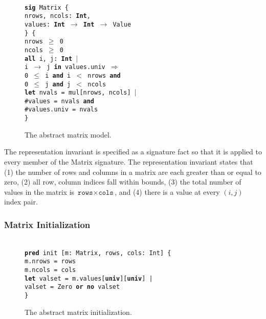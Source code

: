 \documentclass[11pt,conference]{IEEEtran}
\newenvironment{myquote}{\list{}{\leftmargin=12pt\rightmargin=0pt}\item[]}{\endlist}
\def\TA{\makebox[12pt]{}}
\def\TB{\makebox[24pt]{}}
\def\TC{\makebox[36pt]{}}
\def\Bsig{\textbf{sig} }
\def\Bpred{\textbf{pred} }
\def\Ball{\textbf{all} }
\def\Bin{\textbf{in} }
\def\Band{\textbf{and} }
\def\Bor{\textbf{or} }
\def\Bno{\textbf{no} }
\def\Bimplies{$\Rightarrow$ }
\def\Blet{\textbf{let} }
\def\Bint{\textbf{Int}}
\def\Buniv{\textbf{univ}}
\begin{document}
\begin{figure}
\centering
\begin{myquote}\small{\texttt{\\
\Bsig Matrix \{\\
\TA  nrows, ncols: \Bint,\\
\TA  values: \Bint~$\rightarrow$~\Bint~$\rightarrow$~Value\\
\} \{\\
\TA nrows $\geq$ 0\\
\TA ncols $\geq$ 0\\
\TA \Ball i, j: \Bint~$|$\\
\TB i $\rightarrow$ j \Bin values.univ \Bimplies\\
\TC 0 $\leq$ i \Band i $<$ nrows \Band\\
\TC 0 $\leq$ j \Band j $<$ ncols\\
\TA \Blet nvals = mul[nrows, ncols] $|$\\
\TB \#values = nvals \Band\\
\TB \#values.univ = nvals\\
\}
}}
\end{myquote}
\caption{The abstract matrix model.}
\label{model:abstract}
\end{figure}

The representation invariant is specified as a signature fact so that it is applied to every member of the Matrix signature.  The representation invariant states that (1) the number of rows and columns in a matrix are each greater than or equal to zero, (2) all row, column indices fall within bounds, (3) the total number of values in the matrix is $\texttt{rows}\times\texttt{cols}$, and (4) there is a value at every $\left(i, j\right)$ index pair.

\subsubsection{Matrix Initialization}

\begin{figure}
\centering
\begin{myquote}\small{\texttt{\\
\Bpred init [m: Matrix, rows, cols: Int] \{\\
\TA m.nrows = rows\\
\TA m.ncols = cols\\
\TA \Blet valset = m.values[\Buniv][\Buniv] |\\
\TB valset = Zero \Bor \Bno valset\\
\}
}}
\end{myquote}
\caption{The abstract matrix initialization.}
\label{init:abstract}
\end{figure}
\end{document}
